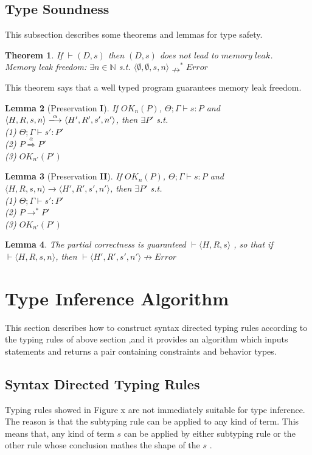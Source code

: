 \documentclass[english]{jssst_ppl} %
\newtheorem{theorem}{Theorem}[section]
\newtheorem{lemma}[theorem]{Lemma}
\begin{document}
\subsection{Type Soundness}
This subsection describes some theorems and lemmas for type safety.
\begin{theorem}\label{thm1}
If $\vdash (D, s)$ then $(D, s)$ does not lead to $memory\;leak$.\\
Memory leak freedom: $\exists n \in \mathbb{N}$ s.t.
$\langle \emptyset, \emptyset, s, n \rangle \nrightarrow^{*}Error$
\end{theorem}
\noindent
This theorem says that a well typed program guarantees memory leak freedom.
\begin{lemma}[Preservation $\mathbf{I}$]%
If $OK_{n}(P)$, $\Theta; \Gamma \vdash s : P$ and $\langle H,R,s, n \rangle
\xlongrightarrow{\alpha}\langle H',R',s', n'
\rangle$, then $\exists P'$ s.t. \\
(1) $ \Theta; \Gamma \vdash s' : P' $ \\
(2) $ P \overset{\text{$\alpha$}}{\Longrightarrow} P'$\\
(3) $ OK_{n'}(P') $
\end{lemma}
\begin{lemma}[Preservation $\mathbf{II}$]%
If $OK_{n}(P)$, $\Theta ; \Gamma \vdash s : P$ and $\langle H,R,s,n \rangle
\rightarrow \langle H',R',s', n'
\rangle$, then $\exists P'$ s.t. \\
(1) $\Theta; \Gamma \vdash s' : P'$\\
(2) $ P \rightarrow^{*} P'  $\\
(3) $OK_{n'}(P')$
\end{lemma}
\begin{lemma}%
 The partial correctness is guaranteed $\vdash \langle H,R,s \rangle$ , so that if $\vdash \langle H,R,s,n \rangle$, then $\vdash \langle H',R',s',n' \rangle \nrightarrow Error$
\end{lemma}
\section{Type Inference Algorithm}
This section describes how to construct syntax directed typing rules according to the typing rules of above section ,and it provides an algorithm which inputs statements and returns a pair containing constraints and behavior types.
\subsection{Syntax Directed Typing Rules}
Typing rules showed in Figure x are not immediately suitable for type inference. The reason is that the subtyping rule can be applied to any kind of term. This means that, any kind of term $s$ can be applied by either subtyping rule or the other rule whose conclusion mathes the shape of the $s$ \cite{plain:book1}.
\end{document}
